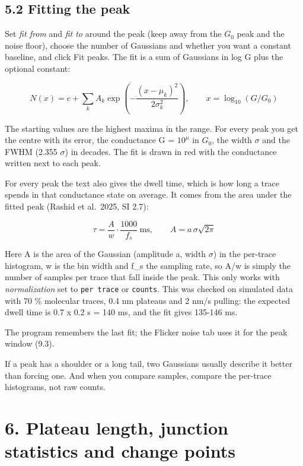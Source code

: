\documentclass[
  11pt,
  a4paper,
]{article}
\begin{document}
\hypertarget{fitting-the-peak}{%
\subsection{5.2 Fitting the peak}\label{fitting-the-peak}}

Set \emph{fit from} and \emph{fit to} around the peak (keep away from
the $G_0$ peak and the noise floor), choose the number of Gaussians and
whether you want a constant baseline, and click Fit peaks. The fit is a
sum of Gaussians in log G plus the optional constant:

\[
N(x) = c + \sum_k A_k \exp\left(-\frac{(x - \mu_k)^2}{2\sigma_k^2}\right), \qquad x = \log_{10}(G/G_0)
\]

The starting values are the highest maxima in the range. For every peak
you get the centre with its error, the conductance G = $10^{\mu}$ in
$G_0$, the width $\sigma$ and the FWHM (2.355 $\sigma$) in decades. The
fit is drawn in red with the conductance written next to each peak.

For every peak the text also gives the dwell time, which is how long a
trace spends in that conductance state on average. It comes from the
area under the fitted peak (Rashid et al.~2025, SI 2.7):

\[
\tau = \frac{A}{w} \cdot \frac{1000}{f_s}\ \mathrm{ms}, \qquad A = a\,\sigma\sqrt{2\pi}
\]

Here A is the area of the Gaussian (amplitude a, width $\sigma$) in the
per-trace histogram, w is the bin width and f\_s the sampling rate, so
A/w is simply the number of samples per trace that fall inside the peak.
This only works with \emph{normalization} set to \texttt{per trace} or
\texttt{counts}. This was checked on simulated data with 70 \% molecular
traces, 0.4 nm plateaus and 2 nm/s pulling: the expected dwell time is
0.7 x 0.2 s = 140 ms, and the fit gives 135-146 ms.

The program remembers the last fit; the Flicker noise tab uses it for
the peak window (9.3).

If a peak has a shoulder or a long tail, two Gaussians usually describe
it better than forcing one. And when you compare samples, compare the
per-trace histograms, not raw counts.

\hypertarget{plateau-length-junction-statistics-and-change-points}{%
\section{6. Plateau length, junction statistics and change
points}\label{plateau-length-junction-statistics-and-change-points}}
\end{document}
